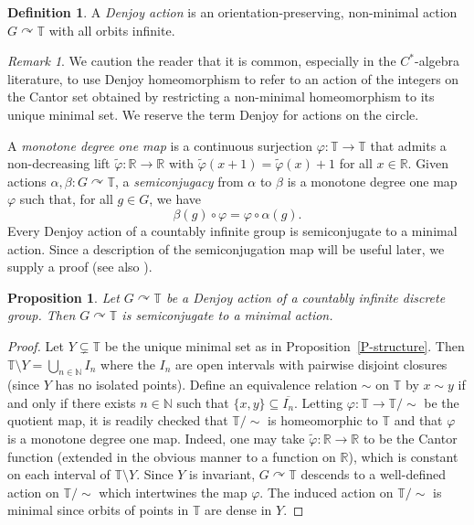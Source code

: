\documentclass[11pt,a4paper,leqno]{amsart}
\newtheorem{prop}[thm]{Proposition}
\theoremstyle{definition}
\newtheorem{df}[thm]{Definition}
\theoremstyle{remark}
\newtheorem{rem}[thm]{Remark}
\numberwithin{equation}{section}
\theoremstyle{plain}
\newcommand{\Nb}{\mathbb{N}}
\newcommand{\Tb}{\mathbb{T}}
\newcommand{\Rb}{\mathbb{R}}
\begin{document}
\begin{df}\label{D-Denjoy}
	A \emph{Denjoy action} is an orientation-preserving, non-minimal action 
	$G \curvearrowright \mathbb T$ with all orbits infinite.
\end{df}

\begin{rem}
	We caution the reader that it is common, especially in the $C^*$-algebra literature, to use Denjoy homeomorphism to refer to an action of the integers on the Cantor set obtained by restricting a non-minimal homeomorphism to its unique minimal set. We reserve the term Denjoy for actions on the circle. 
\end{rem}

A \emph{monotone degree one map} is a continuous surjection 
$\varphi : \mathbb T \to \mathbb T$ that admits a non-decreasing lift 
$\tilde{\varphi} : \mathbb R \to \mathbb R$ with 
$\tilde{\varphi}(x+1) = \tilde{\varphi}(x) + 1$ for all $x\in\Rb$. Given actions $\alpha, \beta : G \curvearrowright \mathbb T$, a \emph{semiconjugacy} from $\alpha$ to $\beta$ is a monotone degree one map $\varphi$ such that, for all $g\in G$, we have
\[
\beta(g) \circ \varphi = \varphi \circ \alpha(g). 
\]
Every Denjoy action of a countably infinite group is semiconjugate to a minimal action. Since a description of the semiconjugation map will be useful later, we supply a proof (see also \cite[Proposition 5.8]{Ghy01}). 

\begin{prop}\label{P-semiconj}
    Let $G\curvearrowright\Tb$ be a Denjoy action of a countably infinite discrete group. Then $G\curvearrowright \Tb$ is semiconjugate to a minimal action.
\end{prop}

\begin{proof}
    Let $Y\subsetneq \Tb$ be the unique minimal set  as in Proposition~\ref{P-structure}. Then $\Tb\setminus Y = \bigcup_{n\in \Nb} I_n$ where the $I_n$ are open intervals with pairwise disjoint closures (since $Y$ has no isolated points). Define an equivalence relation $\sim$ on $\Tb$ by $x\sim y$ if and only if there exists $n\in \Nb$ such that $\{x,y\}\subseteq \overline{I_n}$. Letting $\varphi : \Tb \to \Tb/{\sim}$ be the quotient map, it is readily checked that $\Tb/{\sim}$ is homeomorphic to $\Tb$ and that $\varphi$ is a monotone degree one map. Indeed, one may take $\tilde{\varphi} : \Rb \to \Rb$ to be the Cantor function \cite[\S 2.7]{RoyFit10} (extended in the obvious manner to a function on $\Rb$), which is constant on each interval of $\Tb\setminus Y$. Since $Y$ is invariant, $G\curvearrowright \Tb$ descends to a well-defined action on $\Tb/{\sim}$ which intertwines the map $\varphi$. The induced action on $\Tb/{\sim}$ is minimal since orbits of points in $\Tb$ are dense in $Y$. 
\end{proof}  
\end{document}
